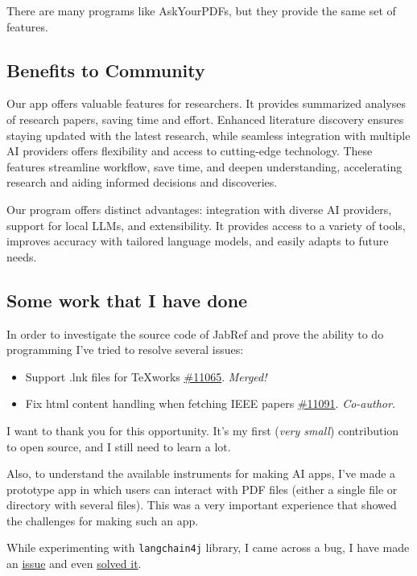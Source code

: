 \documentclass{article}
\begin{document}
	There are many programs like AskYourPDFs, but they provide the same set of features.
	
	\subsection{Benefits to Community}
	Our app offers valuable features for researchers. It provides summarized analyses of research papers, saving time and effort. Enhanced literature discovery ensures staying updated with the latest research, while seamless integration with multiple AI providers offers flexibility and access to cutting-edge technology. These features streamline workflow, save time, and deepen understanding, accelerating research and aiding informed decisions and discoveries.
	
	Our program offers distinct advantages: integration with diverse AI providers, support for local LLMs, and extensibility. It provides access to a variety of tools, improves accuracy with tailored language models, and easily adapts to future needs.
	
	\subsection{Some work that I have done}
	In order to investigate the source code of JabRef and prove the ability to do programming I've tried to resolve several issues:
	\begin{itemize}
		\item  Support .lnk files for TeXworks \href{https://github.com/JabRef/jabref/pull/11065}{\#11065}. \textit{Merged!}
		
		\item  Fix html content handling when fetching IEEE papers \href{https://github.com/JabRef/jabref/pull/11091}{\#11091}. \textit{Co-author.}
	\end{itemize}
	
	I want to thank you for this opportunity. It's my first (\textit{very small}) contribution to open source, and I still need to learn a lot.
	
	Also, to understand the available instruments for making AI apps, I've made a prototype app in which users can interact with PDF files (either a single file or directory with several files). This was a very important experience that showed the challenges for making such an app.
	
	While experimenting with \texttt{langchain4j} library, I came across a bug, I have made an \href{https://github.com/langchain4j/langchain4j/issues/816}{issue} and even \href{https://github.com/langchain4j/langchain4j/pull/817}{solved it}.
	
\end{document}
